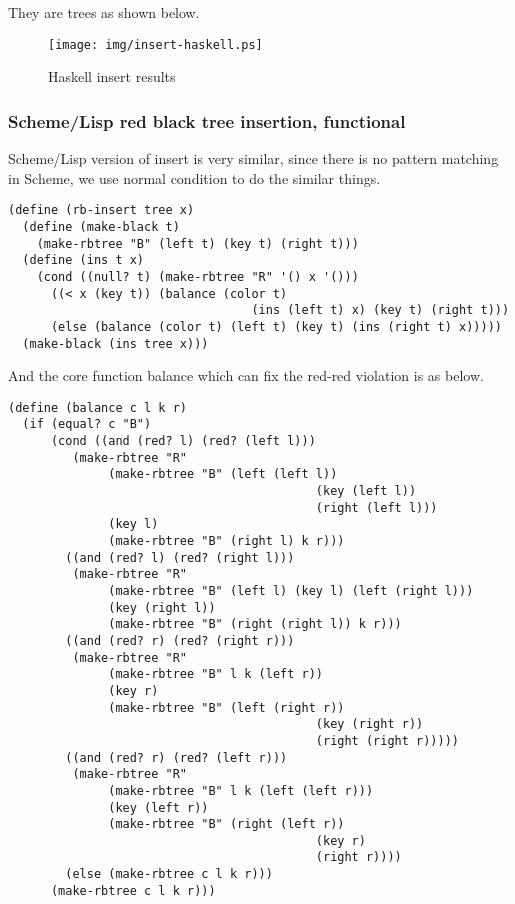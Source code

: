 \documentclass{article}
\begin{document}
They are trees as shown below.

\begin{figure}[htbp]
       \begin{center}
	\texttt{[image: img/insert-haskell.ps]}
        \caption{Haskell insert results} 
       \end{center}
\end{figure}

\subsubsection*{Scheme/Lisp red black tree insertion, functional}

Scheme/Lisp version of insert is very similar, since there is no pattern matching
in Scheme, we use normal condition to do the similar things.

\lstset{language=Lisp}
\begin{lstlisting}
(define (rb-insert tree x)
  (define (make-black t)
    (make-rbtree "B" (left t) (key t) (right t)))
  (define (ins t x)
    (cond ((null? t) (make-rbtree "R" '() x '()))
	  ((< x (key t)) (balance (color t) 
                                  (ins (left t) x) (key t) (right t)))
	  (else (balance (color t) (left t) (key t) (ins (right t) x)))))
  (make-black (ins tree x)))
\end{lstlisting}

And the core function balance which can fix the red-red violation is as below.

\begin{lstlisting}
(define (balance c l k r)
  (if (equal? c "B")
      (cond ((and (red? l) (red? (left l)))
	     (make-rbtree "R" 
			  (make-rbtree "B" (left (left l)) 
                                           (key (left l)) 
                                           (right (left l)))
			  (key l)
			  (make-rbtree "B" (right l) k r)))
	    ((and (red? l) (red? (right l)))
	     (make-rbtree "R"
			  (make-rbtree "B" (left l) (key l) (left (right l)))
			  (key (right l))
			  (make-rbtree "B" (right (right l)) k r)))
	    ((and (red? r) (red? (right r)))
	     (make-rbtree "R" 
			  (make-rbtree "B" l k (left r))
			  (key r)
			  (make-rbtree "B" (left (right r)) 
                                           (key (right r)) 
                                           (right (right r)))))
	    ((and (red? r) (red? (left r)))
	     (make-rbtree "R"
			  (make-rbtree "B" l k (left (left r)))
			  (key (left r))
			  (make-rbtree "B" (right (left r)) 
                                           (key r) 
                                           (right r))))
	    (else (make-rbtree c l k r)))
      (make-rbtree c l k r)))
\end{lstlisting}
\end{document}
